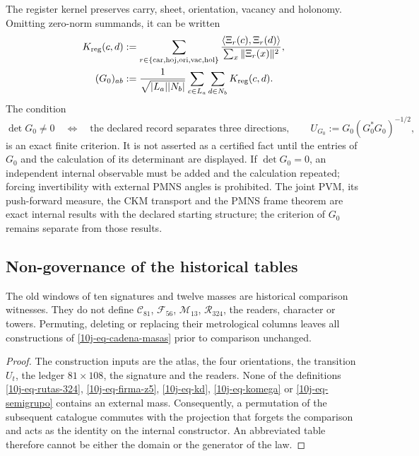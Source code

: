 The register kernel preserves carry, sheet, orientation, vacancy and holonomy. Omitting zero-norm summands, it can be written
\begin{equation}
 \begin{aligned}
 K_{\rm reg}(c,d)&:=
 \sum_{r\in\{\mathrm{car},\mathrm{hoj},\mathrm{ori},\mathrm{vac},\mathrm{hol}\}}
 \frac{\langle\Xi_r(c),\Xi_r(d)\rangle}{\sum_x\|\Xi_r(x)\|^2},\\
 (G_0)_{ab}&:=\frac1{\sqrt{|L_a||N_b|}}
 \sum_{c\in L_a}\sum_{d\in N_b}K_{\rm reg}(c,d).
 \end{aligned}
 \label{10j-eq-pmns-kernel-completo}
\end{equation}
The condition
\begin{equation}
 \det G_0\ne0
 \quad\Longleftrightarrow\quad
 \text{the declared record separates three directions},
 \qquad
 U_{G_0}:=G_0(G_0^*G_0)^{-1/2},
 \label{10j-eq-pmns-criterio-rango}
\end{equation}
is an exact finite criterion. It is not asserted as a certified fact until the entries of \(G_0\) and the calculation of its determinant are displayed. If \(\det G_0=0\), an independent internal observable must be added and the calculation repeated; forcing invertibility with external PMNS angles is prohibited. The joint PVM, its push-forward measure, the CKM transport and the PMNS frame theorem are exact internal results with the declared starting structure; the criterion of \(G_0\) remains separate from those results.

\subsection{Non-governance of the historical tables}

\begin{proposition}
\label{10j-prop-tablas-historicas}
The old windows of ten signatures and twelve masses are historical comparison witnesses. They do not define \(\mathcal C_{81}\), \(\mathcal F_{56}\), \(\mathcal M_{13}\), \(\mathcal R_{324}\), the readers, character or towers. Permuting, deleting or replacing their metrological columns leaves all constructions of \eqref{10j-eq-cadena-masas} prior to comparison unchanged.
\end{proposition}

\begin{proof}
The construction inputs are the atlas, the four orientations, the transition \(U_t\), the ledger \(81\times108\), the signature and the readers. None of the definitions \eqref{10j-eq-rutas-324}, \eqref{10j-eq-firma-z5}, \eqref{10j-eq-kd}, \eqref{10j-eq-komega} or \eqref{10j-eq-semigrupo} contains an external mass. Consequently, a permutation of the subsequent catalogue commutes with the projection that forgets the comparison and acts as the identity on the internal constructor. An abbreviated table therefore cannot be either the domain or the generator of the law.
\end{proof}

